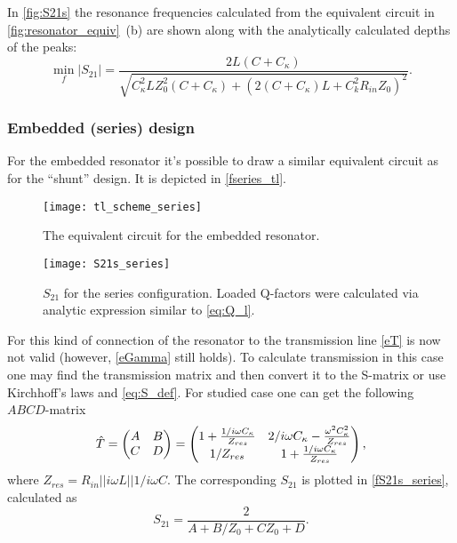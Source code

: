 In \autoref{fig:S21s} the resonance frequencies calculated from the equivalent circuit in \autoref{fig:resonator_equiv}~(b) are shown along with the analytically calculated depths of the peaks:
\begin{equation}
\min_f |S_{21}| = \frac{2 L \left(C + C_{\kappa}\right)}{\sqrt{C_{\kappa}^{2} L Z_{0}^{2} \left(C + C_{\kappa}\right) + \left(2 (C+C_\kappa) L + C_{k}^{2} R_{in} Z_{0} \right)^{2}}}.
\end{equation}

\subsubsection{Embedded (series) design}

For the embedded resonator it's possible to draw a similar equivalent circuit as for the ``shunt'' design\cite{Goppl2008}. It is depicted in \autoref{fseries_tl}. 

\begin{figure}[h]
\centering
\texttt{[image: tl\_scheme\_series]}
\caption{The equivalent circuit for the embedded resonator.}
\label{fseries_tl}
\end{figure}
\begin{figure}[h]
\centering
\texttt{[image: S21s\_series]}
\caption{$S_{21}$ for the series configuration. Loaded Q-factors were calculated  via analytic expression similar to \eqref{eq:Q_l}.}
\label{fS21s_series}
\end{figure}

For this kind of connection of the resonator to the transmission line \eqref{eT} is now not valid (however, \eqref{eGamma} still holds). To calculate transmission in this case one may find the transmission matrix and then convert it to the S-matrix or use Kirchhoff's laws and \eqref{eq:S_def}. For studied case one can get the following $ABCD$-matrix\cite{pozar2012}
\begin{equation}
\hat T = \left( \begin{matrix}
A & B \\
C & D
\end{matrix} \right) = \left( \begin{matrix}
1 + \frac{1/i\omega C_\kappa}{Z_{res}} & 2/i\omega C_\kappa - \frac{\omega^2 C_\kappa^2}{Z_{res}} \\
1/Z_{res} &  1 + \frac{1/i\omega C_\kappa}{Z_{res}} 
\end{matrix} \right),
\end{equation}
where $Z_{res} = R_{in}||i\omega L || 1/i\omega C$. The corresponding $S_{21}$ is plotted in \autoref{fS21s_series}, calculated as\cite{pozar2012} 
\begin{equation}
S_{21} = \frac{2}{A+B/Z_0 +CZ_0 + D}.
\end{equation}

